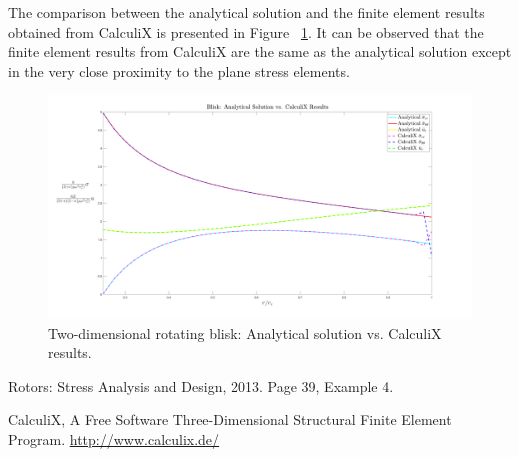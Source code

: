 \documentclass[12pt, a4paper, twoside]{article}
\begin{document}
The comparison between the analytical solution and the finite element results obtained from CalculiX is presented in Figure ~\ref{fig:blisk_analytical_vs_fe}. It can be observed that the finite element results from CalculiX are the same as the analytical solution except in the very close proximity to the plane stress elements.

\clearpage
\begin{landscape}
	\begin{figure}[h]
		\centering
		\includegraphics[scale=0.5]{blisk_analytical_vs_fe}
		\caption{Two-dimensional rotating blisk: Analytical solution vs. CalculiX results.}
		\label{fig:blisk_analytical_vs_fe}
	\end{figure}
\end{landscape}

\clearpage
\begin{thebibliography}{9}	
	Rotors: Stress Analysis and Design, 2013. Page 39, Example 4. 
	
	CalculiX, A Free Software Three-Dimensional Structural Finite Element Program. \url{http://www.calculix.de/}
\end{thebibliography}
\end{document}
